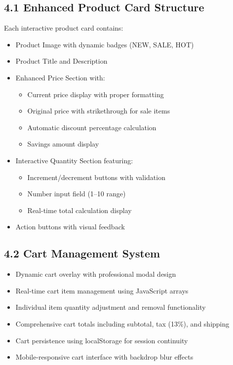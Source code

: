 \documentclass[a4paper,12pt]{article}
\begin{document}
\subsection*{4.1 Enhanced Product Card Structure}
Each interactive product card contains:
\begin{itemize}
  \item Product Image with dynamic badges (NEW, SALE, HOT)
  \item Product Title and Description
  \item Enhanced Price Section with:
        \begin{itemize}
          \item Current price display with proper formatting
          \item Original price with strikethrough for sale items
          \item Automatic discount percentage calculation
          \item Savings amount display
        \end{itemize}
  \item Interactive Quantity Section featuring:
        \begin{itemize}
          \item Increment/decrement buttons with validation
          \item Number input field (1--10 range)
          \item Real-time total calculation display
        \end{itemize}
  \item Action buttons with visual feedback
\end{itemize}

\subsection*{4.2 Cart Management System}
\begin{itemize}
  \item Dynamic cart overlay with professional modal design
  \item Real-time cart item management using JavaScript arrays
  \item Individual item quantity adjustment and removal functionality
  \item Comprehensive cart totals including subtotal, tax (13\%), and shipping
  \item Cart persistence using localStorage for session continuity
  \item Mobile-responsive cart interface with backdrop blur effects
\end{itemize}
\end{document}
